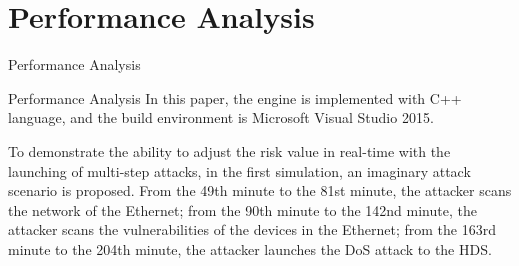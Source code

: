 \section{Performance Analysis}
\begin{frame}{Performance Analysis}
    \begin{minipage}{0.48\textwidth}
    \end{minipage}
    \begin{minipage}{0.48\textwidth}
        \resizebox{!}{0.82\textheight}{}
    \end{minipage}
\end{frame}

\begin{frame}{Performance Analysis}
    In this paper, the \abfbai{} engine is implemented with C++ language, and the build environment is Microsoft Visual Studio 2015.\pause

    To demonstrate the ability to adjust the risk value in real-time with the launching of multi-step attacks, in the first simulation, an imaginary attack scenario is proposed. \pause From the 49th minute to the 81st minute, the attacker scans the network of the Ethernet; \pause from the 90th minute to the 142nd minute, the attacker scans the vulnerabilities of the devices in the Ethernet; \pause from the 163rd minute to the 204th minute, the attacker launches the DoS attack to the HDS.
\end{frame}

